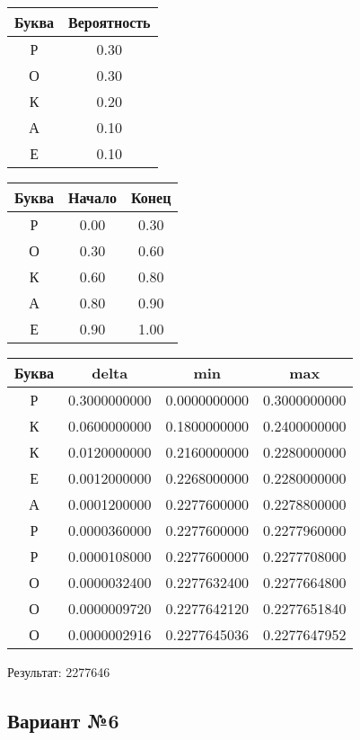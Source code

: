 \documentclass[a4paper, 12pt]{article}
\begin{document}
\begin{center}
 \begin{tabular}{ |c|c| } 
  \hline
     Буква & Вероятность \\ \hline
Р & 0.30\\\hline
О & 0.30\\\hline
К & 0.20\\\hline
А & 0.10\\\hline
Е & 0.10
\\ \hline \end{tabular}
\end{center}
\begin{center}
 \begin{tabular}{ |c|c|c| } 
  \hline
     Буква & Начало & Конец \\ \hline
Р & 0.00 & 0.30\\\hline
О & 0.30 & 0.60\\\hline
К & 0.60 & 0.80\\\hline
А & 0.80 & 0.90\\\hline
Е & 0.90 & 1.00
\\ \hline \end{tabular}
\end{center}
\begin{center}
 \begin{tabular}{ |c|c|c|c| } 
  \hline
     Буква & delta & min & max \\ \hline
Р & 0.3000000000 & 0.0000000000 & 0.3000000000\\\hline
К & 0.0600000000 & 0.1800000000 & 0.2400000000\\\hline
К & 0.0120000000 & 0.2160000000 & 0.2280000000\\\hline
Е & 0.0012000000 & 0.2268000000 & 0.2280000000\\\hline
А & 0.0001200000 & 0.2277600000 & 0.2278800000\\\hline
Р & 0.0000360000 & 0.2277600000 & 0.2277960000\\\hline
Р & 0.0000108000 & 0.2277600000 & 0.2277708000\\\hline
О & 0.0000032400 & 0.2277632400 & 0.2277664800\\\hline
О & 0.0000009720 & 0.2277642120 & 0.2277651840\\\hline
О & 0.0000002916 & 0.2277645036 & 0.2277647952
\\ \hline \end{tabular}
\end{center}
Результат: 2277646
\pagebreak
\subsection{Вариант №6}
\end{document}
